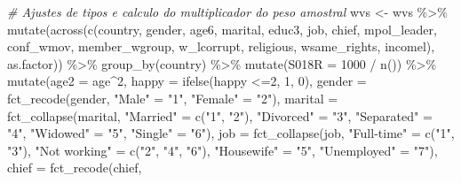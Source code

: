 \documentclass[
]{article}
\newenvironment{Shaded}{\begin{snugshade}}{\end{snugshade}}
\newcommand{\AttributeTok}[1]{\textcolor[rgb]{0.77,0.63,0.00}{#1}}
\newcommand{\CommentTok}[1]{\textcolor[rgb]{0.56,0.35,0.01}{\textit{#1}}}
\newcommand{\DecValTok}[1]{\textcolor[rgb]{0.00,0.00,0.81}{#1}}
\newcommand{\FunctionTok}[1]{\textcolor[rgb]{0.00,0.00,0.00}{#1}}
\newcommand{\NormalTok}[1]{#1}
\newcommand{\OtherTok}[1]{\textcolor[rgb]{0.56,0.35,0.01}{#1}}
\newcommand{\SpecialCharTok}[1]{\textcolor[rgb]{0.00,0.00,0.00}{#1}}
\newcommand{\StringTok}[1]{\textcolor[rgb]{0.31,0.60,0.02}{#1}}
\begin{document}
\begin{Shaded}
\begin{Highlighting}[]
\CommentTok{\# Ajustes de tipos e calculo do multiplicador do peso amostral}
\NormalTok{wvs }\OtherTok{\textless{}{-}}\NormalTok{ wvs }\SpecialCharTok{\%\textgreater{}\%} 
  \FunctionTok{mutate}\NormalTok{(}\FunctionTok{across}\NormalTok{(}\FunctionTok{c}\NormalTok{(country, gender, age6, marital, educ3, job, chief,}
\NormalTok{                  mpol\_leader, conf\_wmov, member\_wgroup, w\_lcorrupt,}
\NormalTok{                  religious, wsame\_rights, incomel), as.factor)) }\SpecialCharTok{\%\textgreater{}\%} 
  \FunctionTok{group\_by}\NormalTok{(country) }\SpecialCharTok{\%\textgreater{}\%}
  \FunctionTok{mutate}\NormalTok{(}\AttributeTok{S018R =} \DecValTok{1000} \SpecialCharTok{/} \FunctionTok{n}\NormalTok{()) }\SpecialCharTok{\%\textgreater{}\%}
  \FunctionTok{mutate}\NormalTok{(}\AttributeTok{age2 =}\NormalTok{ age}\SpecialCharTok{\^{}}\DecValTok{2}\NormalTok{,}
         \AttributeTok{happy =} \FunctionTok{ifelse}\NormalTok{(happy }\SpecialCharTok{\textless{}=}\DecValTok{2}\NormalTok{, }\DecValTok{1}\NormalTok{, }\DecValTok{0}\NormalTok{),}
         \AttributeTok{gender =} \FunctionTok{fct\_recode}\NormalTok{(gender,}
                          \StringTok{"Male"} \OtherTok{=} \StringTok{"1"}\NormalTok{,}
                          \StringTok{"Female"} \OtherTok{=} \StringTok{"2"}\NormalTok{),}
         \AttributeTok{marital =} \FunctionTok{fct\_collapse}\NormalTok{(marital, }
                                \StringTok{"Married"} \OtherTok{=} \FunctionTok{c}\NormalTok{(}\StringTok{"1"}\NormalTok{, }\StringTok{"2"}\NormalTok{),}
                                \StringTok{"Divorced"} \OtherTok{=} \StringTok{"3"}\NormalTok{,}
                                \StringTok{"Separated"} \OtherTok{=} \StringTok{"4"}\NormalTok{,}
                                \StringTok{"Widowed"} \OtherTok{=} \StringTok{"5"}\NormalTok{,}
                                \StringTok{"Single"} \OtherTok{=} \StringTok{"6"}\NormalTok{),}
         \AttributeTok{job =} \FunctionTok{fct\_collapse}\NormalTok{(job,}
                            \StringTok{"Full{-}time"} \OtherTok{=} \FunctionTok{c}\NormalTok{(}\StringTok{"1"}\NormalTok{, }\StringTok{"3"}\NormalTok{),}
                            \StringTok{"Not working"} \OtherTok{=} \FunctionTok{c}\NormalTok{(}\StringTok{"2"}\NormalTok{, }\StringTok{"4"}\NormalTok{, }\StringTok{"6"}\NormalTok{),}
                            \StringTok{"Housewife"} \OtherTok{=} \StringTok{"5"}\NormalTok{,}
                            \StringTok{"Unemployed"} \OtherTok{=} \StringTok{"7"}\NormalTok{),}
         \AttributeTok{chief =} \FunctionTok{fct\_recode}\NormalTok{(chief,}

\end{Highlighting}
\end{Shaded}
\end{document}
